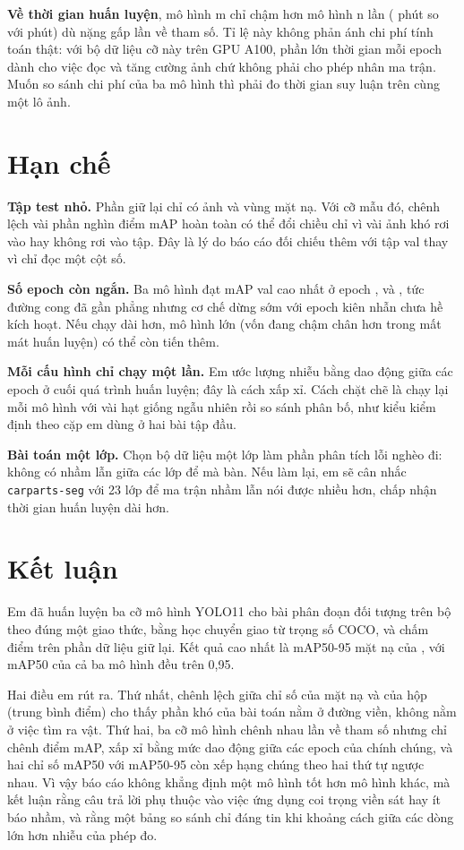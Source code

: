 \documentclass[11pt,a4paper]{article}
\begin{document}
\textbf{Về thời gian huấn luyện}, mô hình m chỉ chậm hơn mô hình n \timeratio{} lần (\mminutes{}
phút so với \nminutes{} phút) dù nặng gấp \paramratio{} lần về tham số. Tỉ lệ này không phản ánh
chi phí tính toán thật: với bộ dữ liệu cỡ này trên GPU A100, phần lớn thời gian mỗi epoch dành cho
việc đọc và tăng cường ảnh chứ không phải cho phép nhân ma trận. Muốn so sánh chi phí của ba mô
hình thì phải đo thời gian suy luận trên cùng một lô ảnh.

\section{Hạn chế}

\textbf{Tập test nhỏ.} Phần giữ lại chỉ có \ntest{} ảnh và \ntestobj{} vùng mặt nạ. Với cỡ mẫu đó,
chênh lệch vài phần nghìn điểm mAP hoàn toàn có thể đổi chiều chỉ vì vài ảnh khó rơi vào hay không
rơi vào tập. Đây là lý do báo cáo đối chiếu thêm với tập val thay vì chỉ đọc một cột số.

\textbf{Số epoch còn ngắn.} Ba mô hình đạt mAP val cao nhất ở epoch \nbestepoch{}, \sbestepoch{} và
\mbestepoch{}, tức đường cong đã gần phẳng nhưng cơ chế dừng sớm với \patience{} epoch kiên nhẫn
chưa hề kích hoạt. Nếu chạy dài hơn, mô hình lớn (vốn đang chậm chân hơn trong mất mát huấn luyện) có thể còn tiến thêm.

\textbf{Mỗi cấu hình chỉ chạy một lần.} Em ước lượng nhiễu bằng dao động giữa các epoch ở cuối quá
trình huấn luyện; đây là cách xấp xỉ. Cách chặt chẽ là chạy lại mỗi mô hình với vài hạt giống ngẫu
nhiên rồi so sánh phân bố, như kiểu kiểm định theo cặp em dùng ở hai bài tập đầu.

\textbf{Bài toán một lớp.} Chọn bộ dữ liệu một lớp làm phần phân tích lỗi nghèo đi: không có nhầm
lẫn giữa các lớp để mà bàn. Nếu làm lại, em sẽ cân nhắc \texttt{carparts-seg} với 23 lớp để ma trận
nhầm lẫn nói được nhiều hơn, chấp nhận thời gian huấn luyện dài hơn.

\section{Kết luận}

Em đã huấn luyện ba cỡ mô hình YOLO11 cho bài phân đoạn đối tượng trên bộ \dataname{} theo đúng một
giao thức, bằng học chuyển giao từ trọng số COCO, và chấm điểm trên phần dữ liệu giữ lại. Kết quả
cao nhất là mAP50-95 mặt nạ \besttestmap{} của \besttest{}, với mAP50 của cả ba mô hình đều trên
0,95.

Hai điều em rút ra. Thứ nhất, chênh lệch giữa chỉ số của mặt nạ và của hộp (trung bình \maskboxgap{} điểm) cho thấy phần khó của bài toán nằm ở đường viền, không nằm ở việc tìm ra
vật. Thứ hai, ba cỡ mô hình chênh nhau \paramratio{} lần về tham số nhưng chỉ chênh \testspread{}
điểm mAP, xấp xỉ bằng mức dao động giữa các epoch của chính chúng, và hai chỉ số mAP50 với mAP50-95
còn xếp hạng chúng theo hai thứ tự ngược nhau. Vì vậy báo cáo không khẳng định một mô hình tốt hơn
mô hình khác, mà kết luận rằng câu trả lời phụ thuộc vào việc ứng dụng coi trọng viền sát hay ít
báo nhầm, và rằng một bảng so sánh chỉ đáng tin khi khoảng cách giữa các dòng lớn hơn nhiễu của
phép đo.
\end{document}
